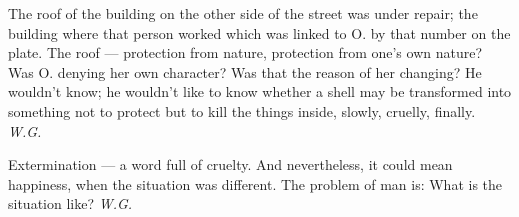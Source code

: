 The roof 
of the building on the other side of the street 
was under repair; 
the building 
where that person worked 
which was linked to O. 
by that number 
on the plate. 
The roof --- 
protection from nature, 
protection from one's own nature? 
Was O. denying her own character? 
Was that the reason of her changing? 
He wouldn't know; 
he wouldn't like to know 
whether a shell may be transformed 
into something not to protect 
but to kill the things inside, 
slowly, cruelly, finally. 
\emph{W.G.}

Extermination --- 
a word full of cruelty. 
And nevertheless, 
it could mean happiness, 
when the situation was different. 
The problem of man is: 
What is the situation like? 
\emph{W.G.}
